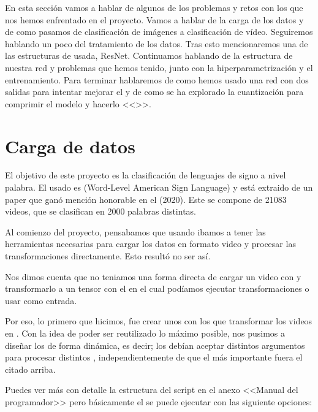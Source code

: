 
En esta sección vamos a hablar de algunos de los problemas y retos con los que nos hemos enfrentado en el proyecto. Vamos a hablar de la carga de los datos y de como pasamos de clasificación de imágenes a clasificación de vídeo. Seguiremos hablando un poco del tratamiento de los datos. Tras esto mencionaremos una de las estructuras de  usada, ResNet. Continuamos hablando de la estructura de nuestra red y problemas que hemos tenido, junto con la hiperparametrización y el entrenamiento. Para terminar hablaremos de como hemos usado una red con dos salidas para intentar mejorar el  y de como se ha explorado la cuantización para comprimir el modelo y hacerlo <<>>.

\section{Carga de datos}

El objetivo de este proyecto es la clasificación de lenguajes de signo a nivel palabra. El  usado  es  (Word-Level American Sign Language) y está extraido de un paper que ganó mención honorable en el  (2020). Este  se compone de 21083 videos, que se clasifican en 2000 palabras distintas.

Al comienzo del proyecto, pensabamos que usando  ibamos a tener las herramientas necesarias para cargar los datos en formato video y procesar las transformaciones directamente. Esto resultó no ser así.

Nos dimos cuenta que no teniamos una forma directa de cargar un video con  y transformarlo a un tensor con el en el cual podíamos ejecutar transformaciones o usar como entrada.

Por eso, lo primero que hicimos, fue crear unos  con los que transformar los videos en . Con la idea de poder ser reutilizado lo máximo posible, nos pusimos a diseñar los  de forma dinámica, es decir; los  debían aceptar distintos argumentos para procesar distintos , independientemente de que el más importante fuera el citado arriba.

Puedes ver más con detalle la estructura del script en el anexo <<Manual del programador>> pero básicamente el  se puede ejecutar con las siguiente opciones:

